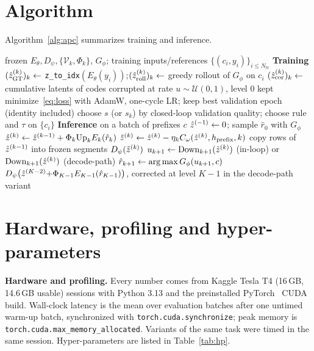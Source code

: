 \section{Algorithm}
\label{app:alg}
Algorithm~\ref{alg:apc} summarizes training and inference.

\begin{algorithm}[t]
\caption{APC-NCM training and inference}
\label{alg:apc}
\begin{algorithmic}[1]
\Require frozen $E_\theta,D_\psi,\{\mathcal{V}_k,\Phi_k\}$, $G_\phi$; training inputs/references $\{(c_i,y_i)\}_{i\le N_{\mathrm{tr}}}$
\State \textbf{Training}
  \State $(\hat{z}^{(k)}_{\mathrm{GT}})_k\gets$ \texttt{z\_to\_idx}$(E_\theta(y_i))$;\quad $(\hat{z}^{(k)}_{\mathrm{roll}})_k\gets$ greedy rollout of $G_\phi$ on $c_i$
  \State $(\hat{z}^{(k)}_{\mathrm{cor}})_k\gets$ cumulative latents of codes corrupted at rate $u\sim\mathcal{U}(0,1)$, level 0 kept
\EndFor
\State minimize~\eqref{eq:loss} with AdamW, one-cycle LR; keep best validation epoch (identity included)
\State choose $s$ (or $s_k$) by closed-loop validation quality; choose rule and $\tau$ on $\{c_i\}$
\State \textbf{Inference} on a batch of prefixes $c$
\State $\hat{z}^{(-1)}\gets 0$; sample $\hat r_0$ with $G_\phi$
  \State $\hat{z}^{(k)}\gets\hat{z}^{(k-1)}+\Phi_k\mathrm{Up}_kE_k(\hat r_k)$ 
  \State $\tilde{z}^{(k)}\gets\hat{z}^{(k)}-\eta_kC_\omega(\hat{z}^{(k)},h_{\mathrm{prefix}},k)$ 
   copy rows of $\hat{z}^{(k-1)}$ into frozen segments \EndIf
   \Return $D_\psi(\tilde{z}^{(k)})$ \EndIf
  \State $u_{k+1}\gets\mathrm{Down}_{k+1}(\tilde{z}^{(k)})$ (in-loop) or $\mathrm{Down}_{k+1}(\hat{z}^{(k)})$ (decode-path)
  \State $\hat r_{k+1}\gets\operatorname*{arg\,max} G_\phi(u_{k+1},c)$
\EndFor
\State \Return $D_\psi\big(\hat{z}^{(K-2)}{+}\Phi_{K-1}E_{K-1}(\hat r_{K-1})\big)$, corrected at level $K{-}1$ in the decode-path variant
\end{algorithmic}
\end{algorithm}

\section{Hardware, profiling and hyper-parameters}
\label{app:hw}
\textbf{Hardware and profiling.} Every number comes from Kaggle Tesla T4 (16\,GB, 14.6\,GB usable) sessions with Python 3.13 and the preinstalled PyTorch~\citep{paszke2019pytorch} CUDA build. Wall-clock latency is the mean over evaluation batches after one untimed warm-up batch, synchronized with \texttt{torch.cuda.synchronize}; peak memory is \texttt{torch.cuda.max\_memory\_allocated}. Variants of the same task were timed in the same session. Hyper-parameters are listed in Table~\ref{tab:hp}.

